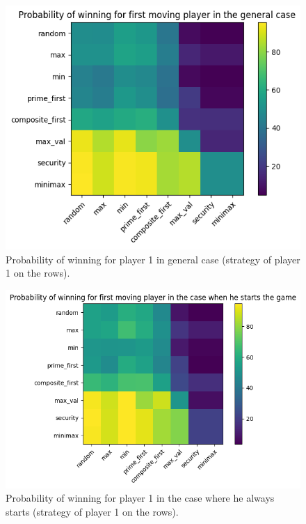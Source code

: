\begin{figure}
    \centering
    \includegraphics[width=1\linewidth]{img/prob_winning_general.png}
    \caption{Probability of winning for player 1 in general case (strategy of player 1 on the rows).}
    \label{fig:prob_generalcase}
\end{figure}

\begin{figure}
    \centering
    \includegraphics[width=1\linewidth]{img/prob_winning_starts.png}
    \caption{Probability of winning for player 1 in the case where he always starts (strategy of player 1 on the rows).}
    \label{fig:prob_starts}
\end{figure}

